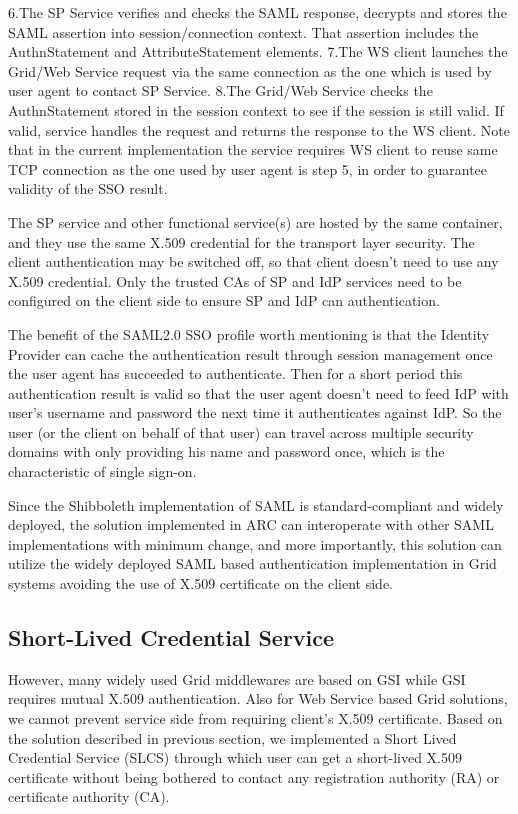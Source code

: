 6.The SP Service verifies and checks the SAML response, decrypts and stores the SAML assertion into session/connection context. That assertion includes the AuthnStatement and AttributeStatement elements.
7.The WS client launches the Grid/Web Service request via the same connection as the one which is used by user agent to contact SP Service.
8.The Grid/Web Service checks the AuthnStatement stored in the session context to see if the session is still valid. If valid, service handles the  request and returns the response to the WS client. Note that in the current implementation the service requires WS client to reuse same TCP connection as the one used by user agent is step 5, in order to guarantee  validity of the SSO result.

The SP service and other functional service(s) are hosted by the same container, and they use the same X.509 credential for the transport layer security. The client authentication may be switched off, so that client doesn’t need to use any X.509 credential. Only the trusted CAs of SP and IdP services need to be configured on the client side to ensure SP and IdP can authentication.

The benefit of the SAML2.0 SSO profile worth mentioning is that the Identity Provider can cache the authentication result through session management once the user agent has succeeded to authenticate. Then for a short period this authentication result is valid so that the user agent doesn’t need to feed IdP with user’s username and password the next time it authenticates against IdP. So the user (or the client on behalf of that user) can travel across multiple security domains with only providing his name and password once, which is the characteristic of single sign-on.

Since the Shibboleth implementation of SAML is standard-compliant and widely deployed, the solution implemented in ARC can interoperate with other SAML implementations with minimum change, and more importantly, this solution can utilize the widely deployed SAML based authentication implementation in Grid systems avoiding the use of X.509 certificate on the client side.


\subsection{Short-Lived Credential Service}
\label{sec:slcs}
However, many widely used Grid middlewares are based on GSI while GSI requires mutual X.509 authentication. Also for Web Service based Grid solutions, we cannot prevent service side from requiring client's X.509 certificate.  Based on the solution described in previous section, we implemented a Short Lived Credential Service (SLCS) through which user can get a short-lived X.509 certificate without being bothered to contact any registration authority (RA) or certificate authority (CA).

